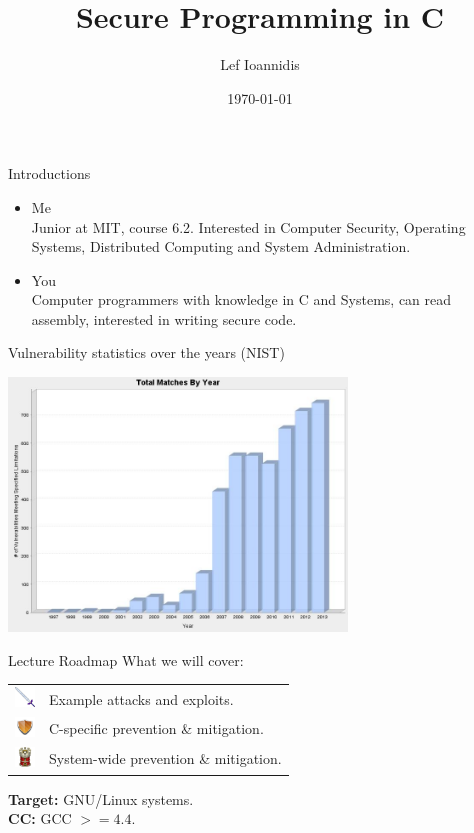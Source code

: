 \documentclass{beamer}
\title[How to secure your stack for fun and profit]{Secure Programming in C}
\author{Lef Ioannidis}
\institute{MIT EECS}
\date{\today}
\newcommand{\sword}{\includegraphics[width=15pt]{sword.png} \hspace*{5pt}}
\newcommand{\shield}{\includegraphics[width=15pt]{shield.png} \hspace*{5pt}}
\newcommand{\castle}{\includegraphics[width=15pt]{castle.png} \hspace*{5pt}}
\begin{document}
\begin{frame}
  \titlepage
\end{frame}
\begin{frame}{Introductions}
\begin{itemize}
\item {\LARGE Me} \\[0.2cm]
Junior at MIT, course 6.2. 
Interested in Computer Security, Operating Systems, Distributed Computing and System Administration.
\vspace*{1cm}
\item {\LARGE You} \\[0.2cm]
Computer programmers with knowledge in C and Systems, can read assembly, interested in writing secure code.
\end{itemize}
\end{frame}
\begin{frame}{Vulnerability statistics over the years (NIST)}
  \begin{center}
    \includegraphics[width=9cm]{nist_vuln_stats.png}
  \end{center}
\end{frame}
\begin{frame}{Lecture Roadmap}
What we will cover:\\

\begin{table}[h!]
\centering
\begin{tabular}{cl}
\sword & Example attacks and exploits. \\
\shield & C-specific prevention \& mitigation. \\
\castle & System-wide prevention \& mitigation. \\
\end{tabular}
\end{table}

\vspace*{0.5cm}
\textbf{Target:} GNU/Linux systems.\\
\textbf{CC:} GCC $>=4.4$.
\end{frame}
\end{document}
